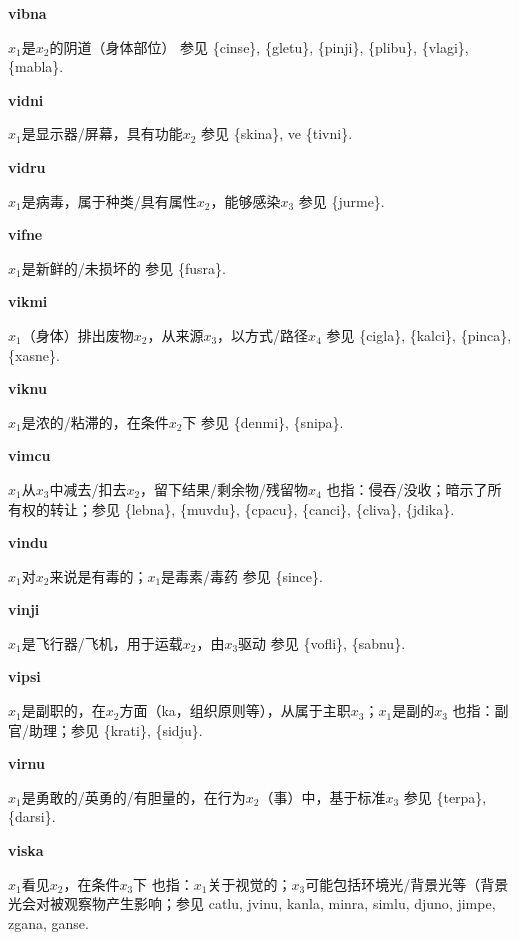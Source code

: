 \documentclass[notitlepage,twocolumn,a4paper,10pt]{book}
\begin{document}
{\sffamily\bfseries vibna}\enspace {\ttfamily\bfseries[vib]}  $x_1$是$x_2$的阴道（身体部位） \textemdash{} 参见 \{cinse\}, \{gletu\}, \{pinji\}, \{plibu\}, \{vlagi\}, \{mabla\}.

{\sffamily\bfseries vidni} $x_1$是显示器\slash{}屏幕，具有功能$x_2$ \textemdash{} 参见 \{skina\}, ve \{tivni\}.

{\sffamily\bfseries vidru}\enspace {\ttfamily\bfseries[vir]}  $x_1$是病毒，属于种类\slash{}具有属性$x_2$，能够感染$x_3$ \textemdash{} 参见 \{jurme\}.

{\sffamily\bfseries vifne}\enspace {\ttfamily\bfseries[vif]}  $x_1$是新鲜的\slash{}未损坏的 \textemdash{} 参见 \{fusra\}.

{\sffamily\bfseries vikmi}\enspace {\ttfamily\bfseries[vim     vi'i]}  $x_1$（身体）排出废物$x_2$，从来源$x_3$，以方式\slash{}路径$x_4$ \textemdash{} 参见 \{cigla\}, \{kalci\}, \{pinca\}, \{xasne\}.

{\sffamily\bfseries viknu}\enspace {\ttfamily\bfseries[vik]}  $x_1$是浓的\slash{}粘滞的，在条件$x_2$下 \textemdash{} 参见 \{denmi\}, \{snipa\}.

{\sffamily\bfseries vimcu}\enspace {\ttfamily\bfseries[vic     vi'u]}  $x_1$从$x_3$中减去\slash{}扣去$x_2$，留下结果\slash{}剩余物\slash{}残留物$x_4$ \textemdash{} 也指：侵吞\slash{}没收；暗示了所有权的转让；参见 \{lebna\}, \{muvdu\}, \{cpacu\}, \{canci\}, \{cliva\}, \{jdika\}.

{\sffamily\bfseries vindu}\enspace {\ttfamily\bfseries[vid]}  $x_1$对$x_2$来说是有毒的；$x_1$是毒素\slash{}毒药 \textemdash{} 参见 \{since\}.

{\sffamily\bfseries vinji}\enspace {\ttfamily\bfseries[vij]}  $x_1$是飞行器\slash{}飞机，用于运载$x_2$，由$x_3$驱动 \textemdash{} 参见 \{vofli\}, \{sabnu\}.

{\sffamily\bfseries vipsi}\enspace {\ttfamily\bfseries[vip]}  $x_1$是副职的，在$x_2$方面（ka，组织原则等），从属于主职$x_3$；$x_1$是副的$x_3$ \textemdash{} 也指：副官\slash{}助理；参见 \{krati\}, \{sidju\}.

{\sffamily\bfseries virnu}\enspace {\ttfamily\bfseries[    vri]}  $x_1$是勇敢的\slash{}英勇的\slash{}有胆量的，在行为$x_2$（事）中，基于标准$x_3$ \textemdash{} 参见 \{terpa\}, \{darsi\}.

{\sffamily\bfseries viska}\enspace {\ttfamily\bfseries[vis     vi'a]}  $x_1$看见$x_2$，在条件$x_3$下 \textemdash{} 也指：$x_1$关于视觉的；$x_3$可能包括环境光\slash{}背景光等（背景光会对被观察物产生影响；参见 {catlu}, {jvinu}, {kanla}, {minra}, {simlu}, {djuno}, {jimpe}, {zgana}, {ganse}.
\end{document}
